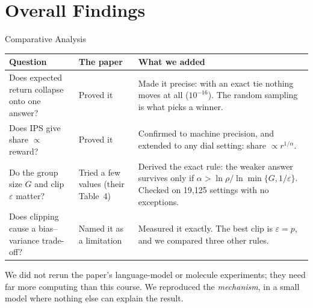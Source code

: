 \documentclass[aspectratio=169,10pt]{beamer}
\begin{document}
\section{Overall Findings}

\begin{frame}{Comparative Analysis}

\centering
\vspace{-1mm}
{\scriptsize
\begin{tabular}{@{}>{\raggedright\arraybackslash}p{3.6cm}
                  >{\raggedright\arraybackslash}p{2.9cm}
                  >{\raggedright\arraybackslash}p{6.3cm}@{}}
\toprule
\textbf{Question} & \textbf{The paper} & \textbf{What we added} \\
\midrule
Does expected return collapse onto one answer? &
  Proved it &
  Made it precise: with an exact tie \alert{nothing moves at all} ($10^{-16}$).
  The random sampling is what picks a winner. \\
\addlinespace[3pt]
Does IPS give share $\propto$ reward? &
  Proved it &
  Confirmed to machine precision, and extended to any dial setting:
  share $\propto r^{1/\alpha}$. \\
\addlinespace[3pt]
Do the group size $G$ and clip $\varepsilon$ matter? &
  Tried a few values (their Table~4) &
  \alert{Derived the exact rule}: the weaker answer survives only if
  $\alpha>\ln\rho/\ln\min\{G,1/\varepsilon\}$. Checked on 19{,}125 settings
  with no exceptions. \\
\addlinespace[3pt]
Does clipping cause a bias--variance trade-off? &
  Named it as a limitation &
  \alert{Measured it exactly}. The best clip is $\varepsilon=p$, and we
  compared three other rules. \\
\bottomrule
\end{tabular}}

\vspace{4mm}
{\footnotesize\raggedright
We did not rerun the paper's language-model or molecule experiments; they need
far more computing than this course. We reproduced the \emph{mechanism}, in a
small model where nothing else can explain the result.\par}
\end{frame}
\end{document}
